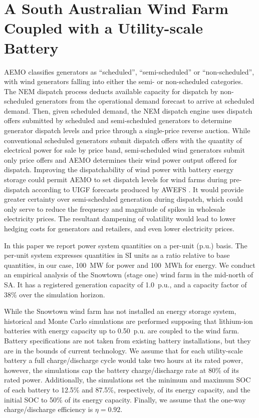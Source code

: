 \documentclass[a4paper, 10pt, twocolumn, preprint, 3p]{elsarticle}
\def\eff{\eta}
\begin{document}
\section{A South Australian Wind Farm Coupled with a Utility-scale Battery}\label{sect:sa_wind_bess}
AEMO classifies generators as ``scheduled'', ``semi-scheduled'' or ``non-scheduled'', with wind generators falling into either the semi- or non-scheduled categories.  The NEM dispatch process deducts available capacity for dispatch by non-scheduled generators from the operational demand forecast to arrive at scheduled demand.  Then, given scheduled demand, the NEM dispatch engine uses dispatch offers submitted by scheduled and semi-scheduled generators to determine generator dispatch levels and price through a single-price reverse auction.  While conventional scheduled generators submit dispatch offers with the quantity of electrical power for sale by price band, semi-scheduled wind generators submit only price offers and AEMO determines their wind power output offered for dispatch.  Improving the dispatchability of wind power with battery energy storage could permit AEMO to set dispatch levels for wind farms during pre-dispatch according to UIGF forecasts produced by AWEFS \citep{AEMO16b}.  It would provide greater certainty over semi-scheduled generation during dispatch, which could only serve to reduce the frequency and magnitude of spikes in wholesale electricity prices.  The resultant dampening of volatility would lead to lower hedging costs for generators and retailers, and even lower electricity prices.

In this paper we report power system quantities on a per-unit (p.u.) basis.  The per-unit system expresses quantities in SI units as a ratio relative to base quantities, in our case, 100~MW for power and 100~MWh for energy.  We conduct an empirical analysis of the Snowtown (stage one) wind farm in the mid-north of SA.  It has a registered generation capacity of 1.0~p.u., and a capacity factor of 38\% over the simulation horizon. 

While the Snowtown wind farm has not installed an energy storage system, historical and Monte Carlo simulations are performed supposing that lithium-ion batteries with energy capacity up to 0.50~p.u. are coupled to the wind farm.  Battery specifications are not taken from existing battery installations, but they are in the bounds of current technology.  We assume that for each utility-scale battery a full charge/discharge cycle would take two hours at its rated power, however, the simulations cap the battery charge/discharge rate at 80\% of its rated power.  Additionally, the simulations set the minimum and maximum SOC of each battery to 12.5\% and 87.5\%, respectively, of its energy capacity, and the initial SOC to 50\% of its energy capacity.  Finally, we assume that the one-way charge/discharge efficiency is $\eff = 0.92$.
\end{document}
